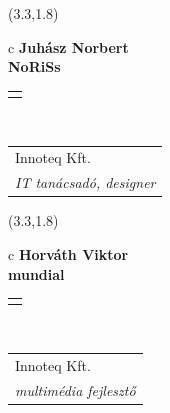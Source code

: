 \documentclass[11pt]{article}
\begin{document}
\makebox(3.3,1.8){
  \renewcommand\arraystretch{1.3}
  \begin{tabular}[c]{c}
    \hspace{8.5mm}
    \LARGE\bf{ Juhász Norbert }\\
    \hspace{8.5mm}
    \Large{ NoRiSs }\\
    \renewcommand\arraystretch{3}
    \begin{tabular}[c]{c}
      \centering
      \fontfamily{phv}\selectfont{
        \textbf{
          \textsc{
            \scriptsize{
            \color{Dark}{ Ismerkedő }\color{Bright}{ Webmester }\color{Bright}{ Sminkmester }\color{Bright}{ Programozó }
            }
          }
        }
      }
    \end{tabular}
    \\
    \renewcommand\arraystretch{1}
    \begin{tabular}{p{3.3in}}
      \hspace{.7cm}Innoteq Kft.\\
      \hspace{.7cm}\emph{ IT tanácsadó, designer }\\
    \end{tabular}
  \end{tabular}
}

\makebox(3.3,1.8){
  \renewcommand\arraystretch{1.3}
  \begin{tabular}[c]{c}
    \hspace{8.5mm}
    \LARGE\bf{ Horváth Viktor }\\
    \hspace{8.5mm}
    \Large{ mundial }\\
    \renewcommand\arraystretch{3}
    \begin{tabular}[c]{c}
      \centering
      \fontfamily{phv}\selectfont{
        \textbf{
          \textsc{
            \scriptsize{
            \color{Dark}{ Ismerkedő }\color{Bright}{ Webmester }\color{Bright}{ Sminkmester }\color{Bright}{ Programozó }
            }
          }
        }
      }
    \end{tabular}
    \\
    \renewcommand\arraystretch{1}
    \begin{tabular}{p{3.3in}}
      \hspace{.7cm}Innoteq Kft.\\
      \hspace{.7cm}\emph{ multimédia fejlesztő }\\
    \end{tabular}
  \end{tabular}
}
\end{document}
